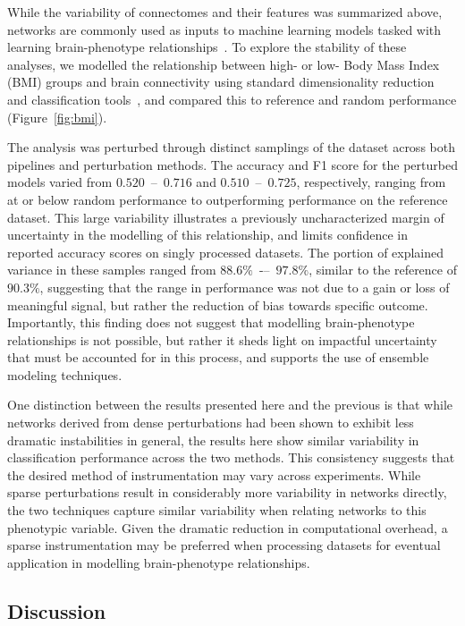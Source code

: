 \documentclass[fleqn,10pt]{SelfArx} %
\newcommand{\new}[1]{{#1}}
\begin{document}
While the variability of connectomes and their features was summarized above, networks are commonly used as inputs to
machine learning models tasked with learning brain-phenotype relationships~\cite{Dubois2016-yr}. To explore the
stability of these analyses, we modelled the relationship between high- or low- Body Mass Index (BMI) groups and brain
connectivity using standard dimensionality reduction and classification tools~\cite{Park2015-uj,Gupta2015-ap}, and
compared this to reference and random performance (Figure~\ref{fig:bmi}).

The analysis was perturbed through distinct samplings of the dataset across both pipelines and perturbation methods.
The accuracy and F1 score for the perturbed models varied from $0.520$~–~$0.716$ and $0.510$~–~$0.725$, respectively,
ranging from at or below random performance to outperforming performance on the reference dataset. This large
variability illustrates a previously uncharacterized margin of uncertainty in the modelling of this relationship, and
limits confidence in reported accuracy scores on singly processed datasets. The portion of explained variance in these
samples ranged from $88.6\%$~-–~$97.8\%$, similar to the reference \new{of $90.3\%$}, suggesting that the range in
performance was not due to a gain or loss of meaningful signal, but rather the reduction of bias towards specific
outcome. Importantly, this finding does not suggest that modelling brain-phenotype relationships is not possible, but
rather it sheds light on impactful uncertainty that must be accounted for in this process, and supports the use of
ensemble modeling techniques.

\new{One distinction between the results presented here and the previous is that while networks derived from dense
perturbations had been shown to exhibit less dramatic instabilities in general, the results here show similar
variability in classification performance across the two methods. This consistency suggests that the desired method of
instrumentation may vary across experiments. While sparse perturbations result in considerably more
variability in networks directly, the two techniques capture similar variability when relating networks to this
phenotypic variable. Given the dramatic reduction in computational overhead, a sparse instrumentation may be preferred
when processing datasets for eventual application in modelling brain-phenotype relationships.}

\subsection*{Discussion}
\end{document}
